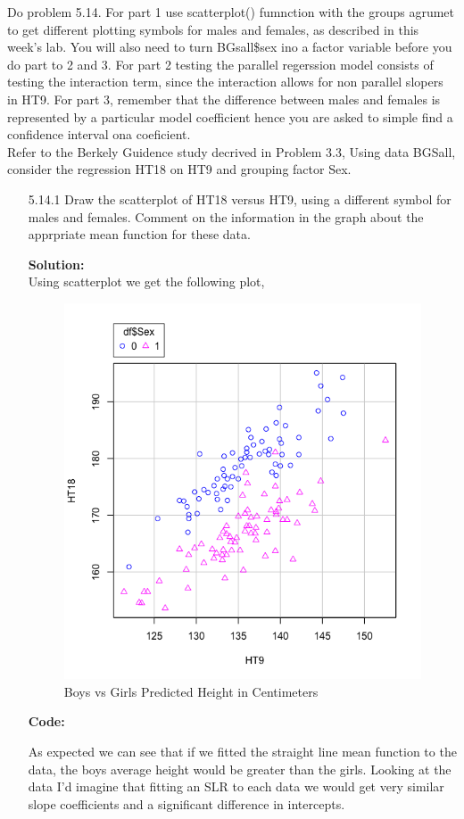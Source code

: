 \documentclass[12pt]{article}
\makeatletter
\theoremstyle{homework}
\newenvironment{exercise}[1]
{\def\@currentlabel{#1}\exercisecore}
{\endexercisecore}
\newcommand{\localhead}[1]{\par\smallskip\noindent\textbf{#1}\nobreak\\}%
\newcommand\solution{\localhead{Solution:}}
\makeatother
\begin{document}
\begin{exercise}{1} Do problem 5.14. For part 1 use scatterplot() fumnction with the groups agrumet to get different 
  plotting symbols for males and females, as described in this week's lab. You will also need to turn BGsall\$sex ino a factor
  variable before you do part to 2 and 3. For part 2 testing the parallel regerssion model consists of testing the interaction
  term, since the interaction allows for non parallel slopers in HT9. For part 3, remember that the difference between males and females is 
  represented by a particular model coefficient hence you are asked to simple find a confidence interval ona  coeficient.\\

  Refer to the Berkely Guidence study decrived in Problem 3.3, Using data BGSall, consider the regression HT18 on HT9 and grouping factor Sex.\\

  \begin{enumerate}
    \item[5.14.1] Draw the scatterplot of HT18 versus HT9, using a different symbol for males and females. Comment on the 
    information in the graph about the apprpriate mean function for these data. \\
    \solution  Using scatterplot we get the following plot, 
    \begin{figure}[H]
      \begin{center}
      \caption{Boys vs Girls Predicted Height in Centimeters}
      \includegraphics[width = .66\textwidth]{Rplot.png}
      \end{center}
     \end{figure}    
       \textbf{Code:}
       \begin{center}
       
       \end{center} 
       As expected we can see that if we fitted the straight line mean function to the data, the boys average height would be greater than the girls. Looking 
       at the data I'd imagine that fitting an SLR to each data we would get very similar slope coefficients and a significant difference in intercepts. 
       \newpage



\end{enumerate}
\end{exercise}
\end{document}

